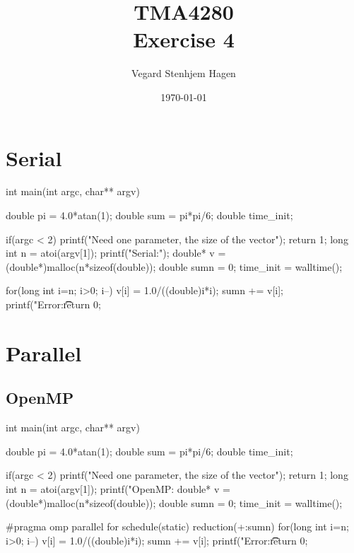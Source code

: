 \documentclass[11pt,a4paper,english]{article}
\title{TMA4280\\Exercise 4}
\author{Vegard Stenhjem Hagen}
\date{\today}
\begin{document}

\maketitle

\section*{Serial}

\begin{ccode}
int main(int argc, char** argv){
    double pi = 4.0*atan(1);
    double sum = pi*pi/6;
    double time_init;

    if(argc < 2) {
        printf("Need one parameter, the size of the vector\n");
        return 1;
    }
    long int n = atoi(argv[1]);
    printf("Serial:\n");
    double* v = (double*)malloc(n*sizeof(double));
    double sumn = 0;
    time_init = walltime();

    for(long int i=n; i>0; i--){
        v[i] = 1.0/((double)i*i);
        sumn += v[i];
    }
    printf("Error:\t\t%
	return 0;
}
\end{ccode}

\section*{Parallel}
\subsection*{OpenMP}
\begin{ccode}
int main(int argc, char** argv){
    double pi = 4.0*atan(1);
    double sum = pi*pi/6;
    double time_init;

    if(argc < 2) {
        printf("Need one parameter, the size of the vector\n");
        return 1;
    }
    long int n = atoi(argv[1]);
    printf("OpenMP\tThreadcount: %
    double* v = (double*)malloc(n*sizeof(double));
    double sumn = 0;
    time_init = walltime();

#pragma omp parallel for schedule(static) reduction(+:sumn)
    for(long int i=n; i>0; i--){
        v[i] = 1.0/((double)i*i);
        sumn += v[i];
    }
    printf("Error:\t\t%
    return 0;
}
\end{ccode}
\end{document}
